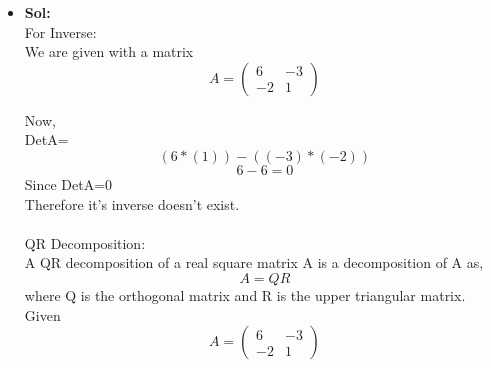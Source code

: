 \documentclass{article}
\begin{document}
\begin{itemize}
\[\[
\begin{pmatrix}
2 & -6\\
1 & -2
\end{pmatrix}
=
\begin{pmatrix}
2/\sqrt{5} & -1/\sqrt{5}\\
1/\sqrt{5} &  2/\sqrt{5}
\end{pmatrix}
*
\begin{pmatrix}
\sqrt{5} & -14/\sqrt{5}\\
0 & 2/\sqrt{5}
\end{pmatrix}
\]\\
\\
\\
\\
\\
\\
\\


\textbf{(b)}
\[
A=
\begin{pmatrix}
6 & -3\\
-2 & 1
\end{pmatrix}
\]

\item{\textbf{Sol:}}\\

For Inverse:\\

We are given with a matrix 
\[
A=
\begin{pmatrix}
6 & -3\\
-2 & 1
\end{pmatrix}
\]

Now,\\

DetA=
 $$
 (6*(1)) - ((-3)*(-2))$$
 $$
 6 - 6=0
 $$
Since DetA=0\\
Therefore it's inverse doesn't exist.\\
\\


QR Decomposition:\\

A QR decomposition of a real square matrix A is a decomposition of A as,\\

$$ A=QR$$
 where Q is the orthogonal matrix and R is the upper triangular matrix.\\
 
 Given\\
 \[
A=
\begin{pmatrix}
6 & -3\\
-2 & 1
\end{pmatrix}
\]

\]
\end{itemize}
\end{document}
